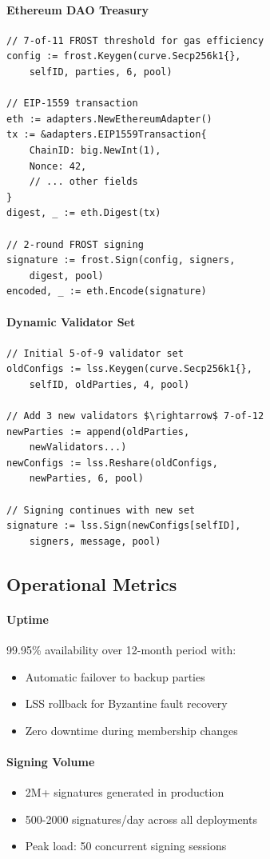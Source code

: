 \documentclass[11pt,twocolumn]{article}
\begin{document}
\paragraph{Ethereum DAO Treasury}
\begin{verbatim}
// 7-of-11 FROST threshold for gas efficiency
config := frost.Keygen(curve.Secp256k1{},
    selfID, parties, 6, pool)

// EIP-1559 transaction
eth := adapters.NewEthereumAdapter()
tx := &adapters.EIP1559Transaction{
    ChainID: big.NewInt(1),
    Nonce: 42,
    // ... other fields
}
digest, _ := eth.Digest(tx)

// 2-round FROST signing
signature := frost.Sign(config, signers,
    digest, pool)
encoded, _ := eth.Encode(signature)
\end{verbatim}

\paragraph{Dynamic Validator Set}
\begin{verbatim}
// Initial 5-of-9 validator set
oldConfigs := lss.Keygen(curve.Secp256k1{},
    selfID, oldParties, 4, pool)

// Add 3 new validators $\rightarrow$ 7-of-12
newParties := append(oldParties,
    newValidators...)
newConfigs := lss.Reshare(oldConfigs,
    newParties, 6, pool)

// Signing continues with new set
signature := lss.Sign(newConfigs[selfID],
    signers, message, pool)
\end{verbatim}

\subsection{Operational Metrics}

\paragraph{Uptime} 99.95\% availability over 12-month period with:
\begin{itemize}
\item Automatic failover to backup parties
\item LSS rollback for Byzantine fault recovery
\item Zero downtime during membership changes
\end{itemize}

\paragraph{Signing Volume}
\begin{itemize}
\item 2M+ signatures generated in production
\item 500-2000 signatures/day across all deployments
\item Peak load: 50 concurrent signing sessions
\end{itemize}
\end{document}
